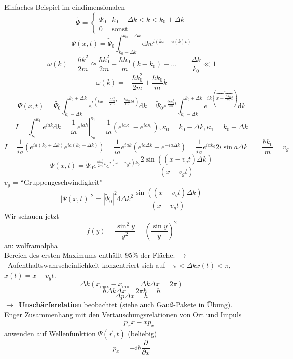 \documentclass[oneside]{book}
\theoremstyle{definition}
\newcommand{\conseq}{$\rightarrow$~}
\renewcommand{\d}{\mathrm d}
\newcommand{\fpartial}[1]{\frac{\partial}{\partial #1}}
\begin{document}

Einfaches Beispiel im eindimensionalen
$$\tilde{\Psi} = \begin{cases}
\tilde{\Psi}_0 & k_0 - \Delta k < k < k_0 + \Delta k\\
0 & \text{sonst}
\end{cases}$$
$$\Psi(x,t) = \tilde{\Psi}_0 \int_{k_0-\Delta k}^{k_0+\Delta k} \d k e^{i(kx - \omega(k)t)}$$
$$\omega(k) = \frac{\hbar k^2}{2m} \approxeq \frac{\hbar k_0^2}{2m} + \frac{\hbar h_0}{m}(k - k_0) + \dots \qquad \frac{\Delta k}{k_0} \ll 1$$
$$\omega(k) = - \frac{\hbar k_0^2}{2m} + \frac{\hbar k_0}{m} k$$
$$\Psi(x,t) = \tilde{\Psi_0} \int_{k_0 - \Delta k}^{k_0 + \Delta k} e^{i (kx + \frac{\hbar h_0^2}{2m}t - \frac{\hbar h_0}{m} k t)} \d k = \tilde{\Psi}_0  e^{\frac{i \hbar h_0^2}{2m}t}  \int_{k_0 - \Delta k}^{k_0 + \Delta k} e^{ik(\overbrace{x - \frac{\hbar k_0}{m}t}^a)} \d k$$
$$ I = \int_{\kappa_0}^{\kappa_1} e^{iak} \d k = \left. \frac{1}{ia} e^{i a h} \right|_{\kappa_0}^{\kappa_1} = \frac1{ia} (e^{ia\kappa_1} - e^{ia\kappa_0}), \kappa_0 = k_0 - \Delta k, \kappa_1 = k_0 + \Delta k$$
$$I = \frac{1}{ia} (e^{ia(k_0 + \Delta k)} e^{ia (k_0 - \Delta k)}) = \frac{1}{ia} e^{iak} (e^{ia \Delta k} - e^{-ia \Delta k}) = \frac{1}{ia} e^{ia k_0} 2 i \sin a \Delta k \qquad \frac{\hbar k_0}{m} = v_g$$
$$\Psi(x,t) = \tilde{\Psi}_0 e^{\frac{i\hbar k_0^2}{2m} t} e^{i (x - v_g t) k_0} \frac{2 \sin((x - v_g t)\Delta k)}{(x - v_g t)}$$
$v_g$ = "`Gruppengeschwindigkeit"'
$$|\Psi(x,t)|^2 = |\tilde{\Psi}_0|^2 4 \Delta k^2 \frac{\sin((x - v_g t)\Delta k)}{(x - v_g t)}$$
Wir schauen jetzt $$f(y) = \frac{\sin^2 y}{y^2} = (\frac{\sin y}{y})^2$$ an: \href{http://www.wolframalpha.com/input/?i=\%28\\frac{\\sin+y}{y}\%29^2}{wolframalpha}\\
Bereich des ersten Maximums enthällt 95\% der Fläche. \conseq Aufenthaltswahrscheinlichkeit konzentriert sich auf $-\pi < \Delta k x(t) < \pi$, $x(t) = x - v_g t$.
$$\Delta k (x_\text{max} - x_\text{min} = \Delta k \Delta x = 2 \pi)$$
$$\hbar\Delta k \Delta x = 2 \pi \hbar = h$$
$$\Delta p \Delta x = h$$
\conseq \textbf{Unschärferelation} beobachtet (siehe auch Gauß-Pakete in Übung).\\
Enger Zusammenhang mit den Vertauschungsrelationen von Ort und Impuls
\begin{align*}
	[p_x, x] &= p_x x - x p_x
\end{align*}
anwenden auf Wellenfunktion $\Psi(\vec{r}, t)$ (beliebig)
$$p_x = - i \hbar \fpartial{x}$$
\end{document}
